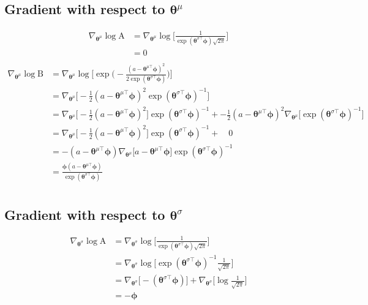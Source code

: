 \documentclass{article}
\newcommand{\grad}[1]{\nabla_{#1}}
\newcommand{\thetab}{\bm{\theta}}
\newcommand{\phib}{\bm{\phi}}
\begin{document}
\subsection{Gradient with respect to $\bm{\theta}^\mu$}
\begin{align*}
\grad{\thetab^\mu} \log\text{A} &= \grad{\thetab^\mu} \log \bigg[\frac{1}{\exp(\thetab^
	{\sigma\top}\phib)\sqrt{2\pi}}\bigg]\\
&=  0\\
\end{align*}
\begin{align*}
\grad{\thetab^\mu} \log \text{B} &= \grad{\thetab^\mu} \log \bigg[ \exp\bigg(- \frac{(a - \thetab^{\mu\top}\phib)^2}{2\exp(\thetab^{\sigma\top}\phib)}\bigg)\bigg]\\
&= \grad{\thetab^\mu} \bigg[-\frac{1}{2} (a - \thetab^{\mu\top}\phib)^2\exp(\thetab^{\sigma\top}\phib)^{-1}\bigg]\\
&= \grad{\thetab^\mu} \bigg[-\frac{1}{2} (a - \thetab^{\mu\top}\phib)^2\bigg] \exp(\thetab^{\sigma\top}\phib)^{-1} + -\frac{1}{2} (a - \thetab^{\mu\top}\phib)^2 \grad{\thetab^\mu} \bigg[\exp(\thetab^{\sigma\top}\phib)^{-1}\bigg]\\
&= \grad{\thetab^\mu} \bigg[-\frac{1}{2} (a - \thetab^{\mu\top}\phib)^2\bigg] \exp(\thetab^{\sigma\top}\phib)^{-1} + \quad 0\\
&= -(a - \thetab^{\mu\top}\phib)\grad{\thetab^\mu} \bigg[a - \thetab^{\mu\top}\phib\bigg] \exp(\thetab^{\sigma\top}\phib)^{-1} \\
&= \frac{{\phib}(a - \thetab^{\mu\top}\phib) }{\exp(\thetab^{\sigma\top}\phib)}\\
\end{align*}
\clearpage
\subsection{Gradient with respect to $\bm{\theta}^\sigma$}
\begin{align*}
	\grad{\thetab^\sigma} \log \text{A} &= \grad{\thetab^\sigma} \log \bigg[\frac{1}{\exp(\thetab^
		{\sigma\top}\phib)\sqrt{2\pi}}\bigg]\\
&= \grad{\thetab^\sigma} \log \bigg[\exp(\thetab^{\sigma\top}\phib)^{-1} \frac{1}{\sqrt{2\pi}}\bigg]\\
&= \grad{\thetab^\sigma} \bigg[-(\thetab^{\sigma\top}\phib) \bigg] + \grad{\thetab^\sigma} \bigg[ \log \frac{1}{\sqrt{2\pi}}\bigg]\\
&=  {-\phib}\\
\end{align*}
\end{document}
